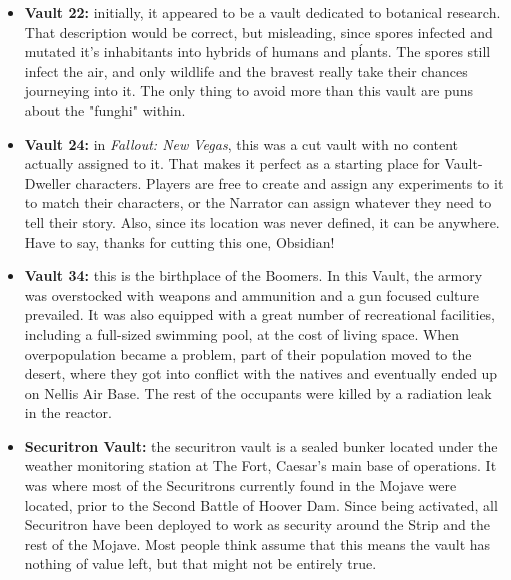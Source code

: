 \begin{itemize}
	\item \textbf{Vault 22:} initially, it appeared to be a vault dedicated to botanical research. That description would be correct, but misleading, since spores infected and mutated it's inhabitants into hybrids of humans and pĺants. The spores still infect the air, and only wildlife and the bravest really take their chances journeying into it. The only thing to avoid more than this vault are puns about the "funghi" within.
	
	\item \textbf{Vault 24:} in \textit{Fallout: New Vegas}, this was a cut vault with no content actually assigned to it. That makes it perfect as a starting place for Vault-Dweller characters. Players are free to create and assign any experiments to it to match their characters, or the Narrator can assign whatever they need to tell their story. Also, since its location was never defined, it can be anywhere. Have to say, thanks for cutting this one, Obsidian!
	
	\item \textbf{Vault 34:} this is the birthplace of the Boomers. In this Vault, the armory was overstocked with weapons and ammunition and a gun focused culture prevailed. It was also equipped with a great number of recreational facilities, including a full-sized swimming pool, at the cost of living space. When overpopulation became a problem, part of their population moved to the desert, where they got into conflict with the natives and eventually ended up on Nellis Air Base. The rest of the occupants were killed by a radiation leak in the reactor.
	
	\item \textbf{Securitron Vault:} the securitron vault is a sealed bunker located under the weather monitoring station at The Fort, Caesar's main base of operations. It was where most of the Securitrons currently found in the Mojave were located, prior to the Second Battle of Hoover Dam. Since being activated, all Securitron have been deployed to work as security around the Strip and the rest of the Mojave. Most people think assume that this means the vault has nothing of value left, but that might not be entirely true.
\end{itemize}